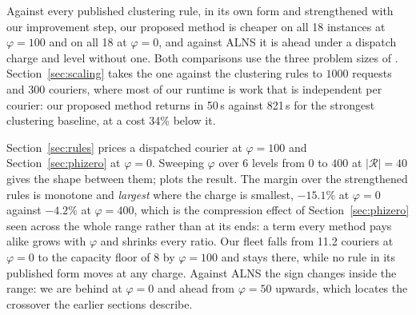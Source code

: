 Against every published clustering rule, in its own form and strengthened with
our improvement step, our proposed method is cheaper on all 18 instances
at $\varphi = 100$ and on all 18 at $\varphi = 0$, and against ALNS it is
ahead under a dispatch charge and level without one. Both comparisons use the
three problem sizes of . Section~\ref{sec:scaling} takes the
one against the clustering rules to $1000$ requests and
$300$ couriers, where most of our runtime is work that is
independent per courier: our proposed method returns in
50\,s against
821\,s for the strongest clustering baseline, at a cost
34\% below
it.

\label{sec:phisweep}
Section~\ref{sec:rules} prices a dispatched courier at $\varphi=100$ and
Section~\ref{sec:phizero} at $\varphi=0$. Sweeping $\varphi$ over
6 levels from $0$ to $400$ at
$|\mathcal{R}|=40$ gives the shape between them;
 plots the result. The margin over the
strengthened rules is monotone and \emph{largest} where the charge is
smallest, $-15.1\%$ at $\varphi=0$ against
$-4.2\%$ at $\varphi=400$, which is the compression
effect of Section~\ref{sec:phizero} seen across the whole range rather than at
its ends: a term every method pays alike grows with $\varphi$ and shrinks every
ratio. Our fleet falls from 11.2
couriers at $\varphi=0$ to the capacity floor of $8$ by
$\varphi=100$ and stays there, while no rule in its published form moves
at any charge. Against ALNS the sign changes
inside the range: we are behind at $\varphi=0$ and ahead from
$\varphi=50$ upwards, which locates the crossover the earlier
sections describe.

